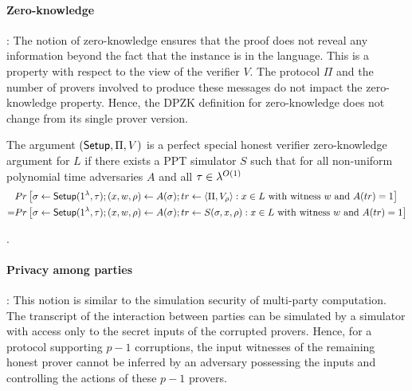 \paragraph{Zero-knowledge}: 
The notion of zero-knowledge ensures that the proof does not reveal any information beyond the fact that the instance is in the language.
This is a property with respect to the view of the verifier $V$. The protocol $\Pi$ and the number of provers involved to produce these messages do not impact the zero-knowledge property. Hence, the DPZK definition for zero-knowledge does not change from its single prover version.
\begin{definition}
The argument $(\mathsf{Setup}, \Pi, V)$ is a perfect special honest verifier zero-knowledge argument for $L$ if there exists a PPT simulator $S$ such that for all non-uniform polynomial time adversaries $A$ and all $\tau \in {\lambda}^{O(1)}$ 
\begin{align*}
&Pr \left[ \sigma \leftarrow \mathsf{Setup}(1^{\lambda}, \tau); (x,w,\rho) \leftarrow A(\sigma); tr \leftarrow \langle \Pi, V_\rho \rangle: x \in L \text{ with witness } w \text{ and } A(tr)=1 \right] \\
= &Pr \left[\sigma \leftarrow \mathsf{Setup}(1^{\lambda}, \tau); (x,w,\rho) \leftarrow A(\sigma); tr \leftarrow S(\sigma,x,\rho): x \in L \text{ with witness } w \text{ and } A(tr) = 1 \right]
\end{align*}
\end{definition}
.

\paragraph{Privacy among parties}:
This notion is similar to the simulation security of multi-party computation. The transcript of the interaction between parties can be simulated by a simulator with access only to the secret inputs of the corrupted provers. Hence, for a protocol supporting $p-1$ corruptions, the input witnesses of the remaining honest prover cannot be inferred by an adversary possessing the inputs and controlling the actions of these $p-1$ provers.

